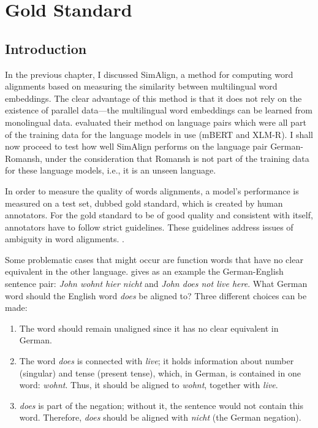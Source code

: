 \chapter{Gold Standard}
\label{chap:gold-standard}
\section{Introduction}
In the previous chapter, I discussed SimAlign, a method for computing word alignments based on measuring the similarity between multilingual word embeddings. 
The clear advantage of this method is that it does not rely on the existence  of parallel data---the multilingual word embeddings can be learned from monolingual data. 
\textcite{jalili-sabet-etal-2020-simalign} evaluated their method on language pairs which were all part of the training data for the language models in use (mBERT and XLM-R). 
I shall now proceed to test how well SimAlign performs on the language pair German-Romansh, under the consideration that Romansh is not part of  the training data for these language models, i.e., it is an unseen language. 

In order to measure the quality of words alignments, a model's performance is measured on a test set, dubbed  gold standard, which is created by human annotators. 
For the gold standard to be of good quality and consistent with itself, annotators have to follow strict guidelines.
These guidelines address issues of ambiguity in word alignments. \autocite[115]{koehn2009}. 

Some problematic cases that might occur are function words\footnotemark{} that have no clear equivalent in the other language.
\textcite{koehn2009} gives as an example the German-English sentence pair: \emph{John wohnt hier nicht}  and \emph{John does not live here}. 
What German word should the English word \emph{does} be aligned to? 
Three different choices can be made:
\begin{enumerate}
	\item The word should remain unaligned since it has no clear equivalent in German.
	\item The word \emph{does} is connected with \emph{live}; it holds information about number (singular) and tense (present tense), which, in German, is contained in one word: \emph{wohnt}. Thus, it should be aligned to \emph{wohnt}, together with \emph{live}.
	\item \emph{does} is part of the negation; without it, the sentence would not contain this word. Therefore, \emph{does} should be aligned with \emph{nicht} (the German negation).
\end{enumerate}

